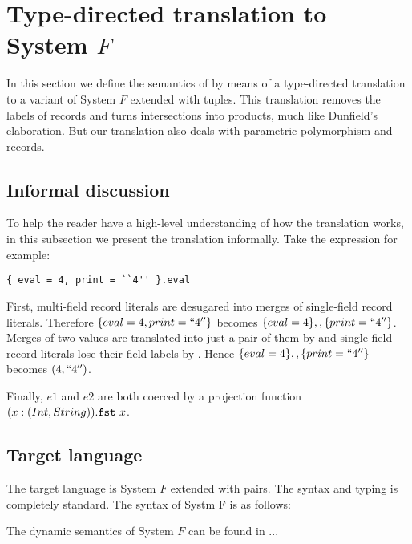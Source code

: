 \section{Type-directed translation to System $ F $}

In this section we define the semantics of \name by means of a type-directed
translation to a variant of System $ F $ extended with tuples. This translation
removes the labels of records and turns intersections into products, much like
Dunfield's elaboration. But our translation also deals with parametric
polymorphism and records.

\subsection{Informal discussion}

To help the reader have a high-level understanding of how the translation
works, in this subsection we present the translation informally. Take the \name
expression for example:

\begin{lstlisting}
{ eval = 4, print = ``4'' }.eval
\end{lstlisting}

First, multi-field record literals are desugared into merges of single-field
record literals. Therefore $ \{ eval = 4, print = ``4'' \} $ becomes
$ \{ eval = 4 \} ,, \{ print = ``4'' \} $. Merges of two values are translated
into just a pair of them by  and single-field record literals lose their field
labels by . Hence $ \{ eval = 4 \} ,, \{ print = ``4'' \} $
becomes $ (4, ``4'') $.

Finally, $ e1 $ and $ e2 $ are both coerced by a projection function
$ \\(x:(Int,String)). \texttt{fst} ~ x $.

\subsection{Target language}

The target language is System $ F $ extended with pairs. The syntax and typing is
completely standard. The syntax of Systm F is as follows:



The dynamic semantics of System $ F $ can be found in ...

